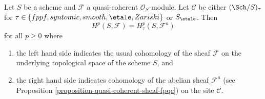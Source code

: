 \begin{theorem}
\label{theorem-zariski-fpqc-quasi-coherent}
Let $S$ be a scheme and $\mathcal{F}$ a quasi-coherent $\mathcal{O}_S$-module.
Let $\mathcal{C}$ be either $(\Sch/S)_\tau$ for
$\tau \in \{fppf, syntomic, smooth, \etale, Zariski\}$ or
$S_\etale$. Then
$$
H^p(S, \mathcal{F}) = H^p_\tau(S, \mathcal{F}^a)
$$
for all $p \geq 0$ where
\begin{enumerate}
\item the left hand side indicates the usual cohomology of the sheaf
$\mathcal{F}$ on the underlying topological space of the scheme $S$, and
\item the right hand side indicates cohomology
of the abelian sheaf $\mathcal{F}^a$ (see
Proposition \ref{proposition-quasi-coherent-sheaf-fpqc})
on the site $\mathcal{C}$.
\end{enumerate}
\end{theorem}

